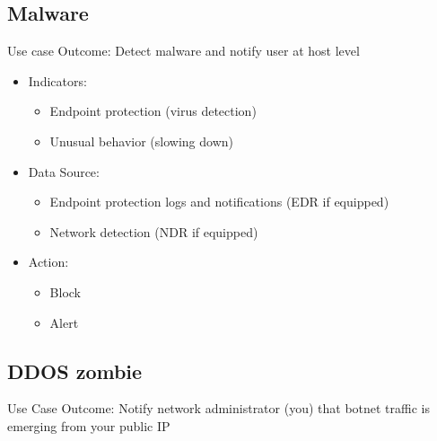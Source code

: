 \documentclass[
	letterpaper, %
	10pt, %
	unnumberedsections, %
	twoside, %
]{APAAssignment}
\begin{document}
\subsection{Malware}
Use case Outcome: Detect malware and notify user at host level
\begin{spacing}{1}
	\begin{itemize}
		\item Indicators:
		      \begin{itemize}
			      \item Endpoint protection (virus detection)
			      \item Unusual behavior (slowing down)
		      \end{itemize}
		\item Data Source:
		      \begin{itemize}
			      \item Endpoint protection logs and notifications (EDR if equipped)
			      \item Network detection (NDR if equipped)
		      \end{itemize}
		\item Action:
		      \begin{itemize}
			      \item Block
			      \item Alert
		      \end{itemize}
	\end{itemize}
\end{spacing}

\subsection{DDOS zombie}
Use Case Outcome: Notify network administrator (you) that botnet traffic is emerging from your public IP
\end{document}
